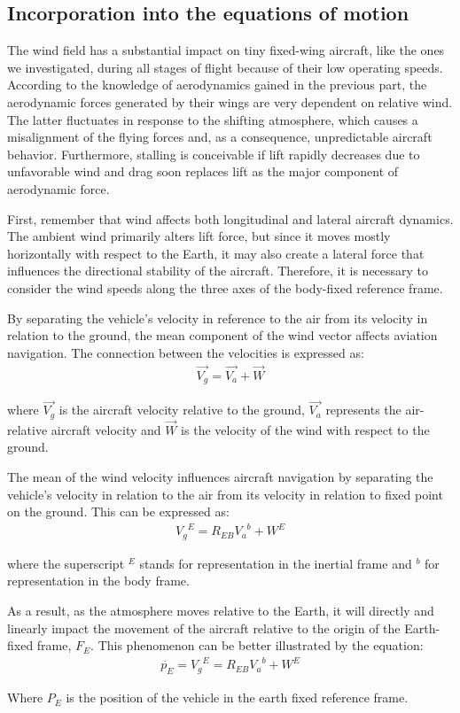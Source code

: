 \documentclass[twocolumn,showpacs,
    nofootinbib,aps,superscriptaddress,
    eqsecnum,prd,showkeys,10pt,floatfix]{revtex4}
\begin{document}
\subsection{Incorporation into the equations of motion}
\par
The wind field has a substantial impact on tiny fixed-wing aircraft, like the
ones we investigated, during all stages of flight because of their low operating
speeds. According to the knowledge of aerodynamics gained in the previous part,
the aerodynamic forces generated by their wings are very dependent on relative
wind. The latter fluctuates in response to the shifting atmosphere, which
causes a misalignment of the flying forces and, as a consequence, unpredictable
aircraft behavior. Furthermore, stalling is conceivable if lift rapidly
decreases due to unfavorable wind and drag soon replaces lift as the major
component of aerodynamic force.
\par
First, remember that wind affects both longitudinal and lateral aircraft
dynamics. The ambient wind primarily alters lift force, but since it moves
mostly horizontally with respect to the Earth, it may also create a lateral
force that influences the directional stability of the aircraft. Therefore, it
is necessary to consider the wind speeds along the three axes of the body-fixed
reference frame.
\par
By separating the vehicle's velocity in reference to the air from its velocity
in relation to the ground, the mean component of the wind vector affects
aviation navigation. The connection between the velocities is expressed as:
\begin{align}
    \vec{V_g}=\vec{V_a}+\vec{W}
\end{align}
\par
where $\vec{V_g}$ is the aircraft velocity relative to the ground, $\vec{V_a}$ represents
the air-relative aircraft velocity and $\vec{W}$ is the velocity of the wind with
respect to the ground.
\par
The mean of the wind velocity influences aircraft navigation by separating the
vehicle's velocity in relation to the air from its velocity in relation to
fixed point on the ground. This can be expressed as:
\begin{align}
    {V_g}^E=R_{EB}{V_a}^b+W^E
    \label{AircraftVelocityRelativeToGroundInThePresenceOfWind}
\end{align}
\par
where the superscript $^E$ stands for representation in the inertial frame and $^b$ for
representation in the body frame.
\par
As a result, as the atmosphere moves relative to the Earth, it will directly
and linearly impact the movement of the aircraft relative to the origin of the
Earth-fixed frame, $F_E$. This phenomenon can be better illustrated by the
equation:
\begin{align}
    \dot{p_E}={V_g}^E={R_{EB}}{V_a}^b+W^E
    \label{AircraftPositionDerivativeRelativeToGroundInThePresenceOfWind}
\end{align}
\par
Where $P_E$ is the position of the vehicle in the earth fixed reference frame.
\end{document}
